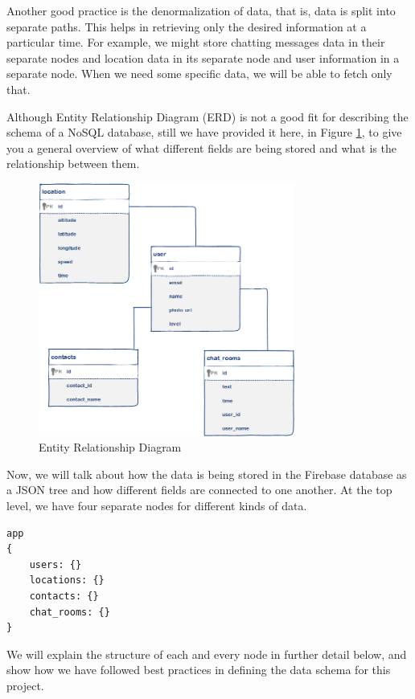 Another good practice is the denormalization of data, that is, data is split into separate paths. This helps in retrieving only the desired information at a particular time. For example, we might store chatting messages data in their separate nodes and location data in its separate node and user information in a separate node. When we need some specific data, we will be able to fetch only that.

Although Entity Relationship Diagram (ERD) is not a good fit for describing the schema of a NoSQL database, still we have provided it here, in Figure \ref{fig:erd}, to give you a general overview of what different fields are being stored and what is the relationship between them.

\begin{figure} [H]
    \centering
        \includegraphics[width=0.75\textwidth]{images/erd.png}
    \caption{Entity Relationship Diagram}
    \label{fig:erd}
\end{figure}

Now, we will talk about how the data is being stored in the Firebase database as a JSON tree and how different fields are connected to one another. At the top level, we have four separate nodes for different kinds of data.
 
\begin{verbatim}
app 
{
    users: {}
    locations: {}
    contacts: {}
    chat_rooms: {}
}
\end{verbatim}

We will explain the structure of each and every node in further detail below, and show how we have followed best practices in defining the data schema for this project.

